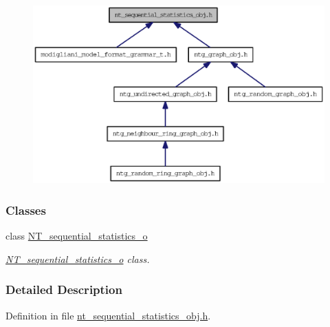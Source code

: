 \begin{figure}[H]
\begin{center}
\leavevmode
\includegraphics[width=400pt]{nt__sequential__statistics__obj_8h__dep__incl}
\end{center}
\end{figure}
\subsubsection*{Classes}
\begin{DoxyCompactItemize}
\item 
class \hyperlink{class_n_t__sequential__statistics__o}{NT\_\-sequential\_\-statistics\_\-o}
\begin{DoxyCompactList}\small\item\em \hyperlink{class_n_t__sequential__statistics__o}{NT\_\-sequential\_\-statistics\_\-o} class. \item\end{DoxyCompactList}\end{DoxyCompactItemize}


\subsubsection{Detailed Description}


Definition in file \hyperlink{nt__sequential__statistics__obj_8h_source}{nt\_\-sequential\_\-statistics\_\-obj.h}.


